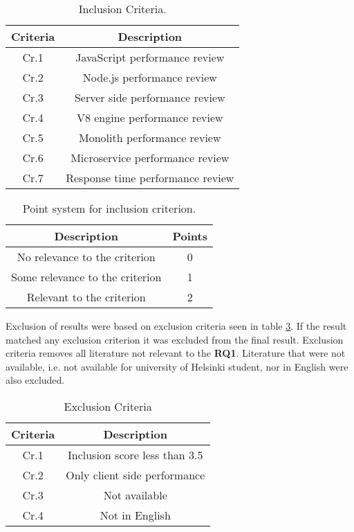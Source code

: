 \begin{table}[ht!]
    \begin{tabular}{|c c|} 
        \hline
        Criteria & Description \\ [0.5ex] 
        \hline
        Cr.1 & JavaScript performance review
        \\ 
        \hline
        Cr.2 & Node.js performance review  \\ 
        \hline
        Cr.3 & Server side performance review  \\ 
        \hline
        Cr.4 & V8 engine performance review  \\ 
        \hline
        Cr.5 & Monolith performance review  \\ 
        \hline
        Cr.6 & Microservice performance review  \\ 
        \hline
        Cr.7 & Response time performance review  \\ 
        \hline
    \end{tabular}    
    \caption{Inclusion Criteria.}
    \label{table:literature:inclusionCriteria}
\end{table}

\begin{table}[ht!]
    \begin{tabular}{|c c|}
        \hline
        Description & Points \\ [0.5ex] 
        \hline
         No relevance to the criterion & 0  \\ 
        \hline
        Some relevance to the criterion & 1 \\ 
        \hline
        Relevant to the criterion & 2 \\ 
        \hline
    \end{tabular}
    \caption{Point system for inclusion criterion.}
    \label{table:literature:pointSystem}
\end{table}

Exclusion of results were based on exclusion criteria seen in table \ref{table:literature:exclusionCriteria}.
If the result matched any exclusion criterion it was excluded from the final result.
Exclusion criteria removes all literature not relevant to the \textbf{RQ1}.
Literature that were not available, i.e. not available for university of Helsinki student, nor in English were also excluded.

\begin{table}[ht!]
    \begin{tabular}{|c c|} 
        \hline
        Criteria & Description \\ [0.5ex] 
        \hline
        Cr.1 & Inclusion score less than 3.5 \\
        \hline
        Cr.2 & Only client side performance  \\
        \hline
        Cr.3 & Not available \\
        \hline
        Cr.4 & Not in English \\
        \hline
    \end{tabular}    
    \caption{Exclusion Criteria}
    \label{table:literature:exclusionCriteria}
\end{table}

